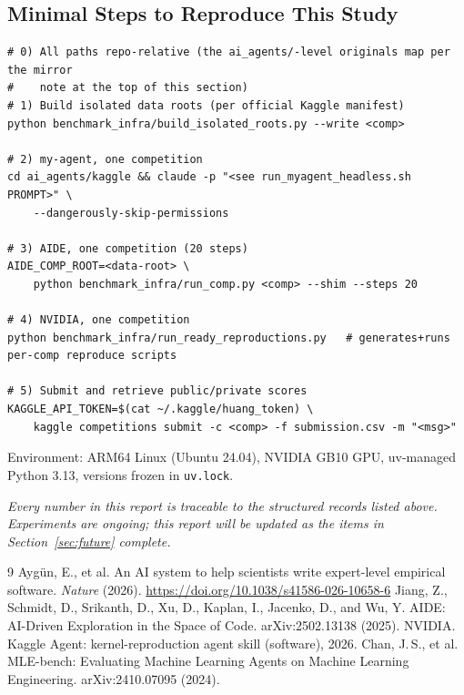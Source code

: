 \documentclass[11pt,a4paper]{article}
\begin{document}
\subsection{Minimal Steps to Reproduce This Study}

\begin{verbatim}
# 0) All paths repo-relative (the ai_agents/-level originals map per the mirror
#    note at the top of this section)
# 1) Build isolated data roots (per official Kaggle manifest)
python benchmark_infra/build_isolated_roots.py --write <comp>

# 2) my-agent, one competition
cd ai_agents/kaggle && claude -p "<see run_myagent_headless.sh PROMPT>" \
    --dangerously-skip-permissions

# 3) AIDE, one competition (20 steps)
AIDE_COMP_ROOT=<data-root> \
    python benchmark_infra/run_comp.py <comp> --shim --steps 20

# 4) NVIDIA, one competition
python benchmark_infra/run_ready_reproductions.py   # generates+runs per-comp reproduce scripts

# 5) Submit and retrieve public/private scores
KAGGLE_API_TOKEN=$(cat ~/.kaggle/huang_token) \
    kaggle competitions submit -c <comp> -f submission.csv -m "<msg>"
\end{verbatim}

Environment: ARM64 Linux (Ubuntu 24.04), NVIDIA GB10 GPU, uv-managed Python 3.13, versions frozen in \texttt{uv.lock}.

\vspace{1em}
\noindent\emph{Every number in this report is traceable to the structured records listed above. Experiments are ongoing; this report will be updated as the items in Section~\ref{sec:future} complete.}


\begin{thebibliography}{9}
 Ayg\"un, E., et al. An AI system to help scientists write expert-level empirical software. \emph{Nature} (2026). \url{https://doi.org/10.1038/s41586-026-10658-6}
 Jiang, Z., Schmidt, D., Srikanth, D., Xu, D., Kaplan, I., Jacenko, D., and Wu, Y. AIDE: AI-Driven Exploration in the Space of Code. arXiv:2502.13138 (2025).
\bibitem{nvidia2026} NVIDIA. Kaggle Agent: kernel-reproduction agent skill (software), 2026.
\bibitem{mlebench} Chan, J.\,S., et al. MLE-bench: Evaluating Machine Learning Agents on Machine Learning Engineering. arXiv:2410.07095 (2024).
\end{thebibliography}
\end{document}
